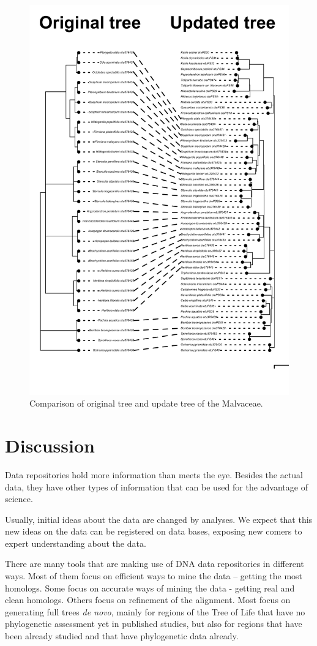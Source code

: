 \documentclass[]{article}
\begin{document}
\begin{figure}
\includegraphics[width=0.75\linewidth]{docs/figs/cotree-plot2-1} \caption{Comparison of original tree and update tree of the Malvaceae.}\label{fig:fig-2}
\end{figure}

\hypertarget{discussion}{%
\section{Discussion}\label{discussion}}

Data repositories hold more information than meets the eye.
Besides the actual data, they have other types of information that can be used for the advantage of science.

Usually, initial ideas about the data are changed by analyses.
We expect that this new ideas on the data can be registered on data bases,
exposing new comers to expert understanding about the data.

There are many tools that are making use of DNA data repositories in different ways.
Most of them focus on efficient ways to mine the data -- getting the most homologs.
Some focus on accurate ways of mining the data - getting real and clean homologs.
Others focus on refinement of the alignment.
Most focus on generating full trees \emph{de novo}, mainly for regions of the Tree of
Life that have no phylogenetic assessment yet in published studies, but also for
regions that have been already studied and that have phylogenetic data already.
\end{document}
